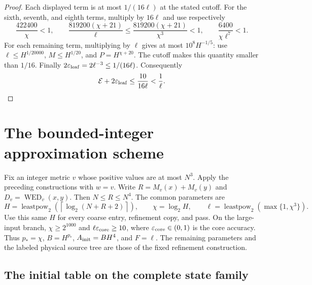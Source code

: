 \documentclass[11pt]{article}
\theoremstyle{definition}
\newcommand{\WED}{\operatorname{WED}}
\newcommand{\1}{\mathbf 1}
\begin{document}
\begin{proof}
Each displayed term is at most $1/(16\ell)$ at the stated cutoff. For the sixth, seventh, and eighth terms, multiply by $16\ell$ and use respectively
\[
 \frac{422400}{\chi}<1,\qquad
 \frac{819200(\chi+21)}{\ell}\le
 \frac{819200(\chi+21)}{\chi^3}<1,\qquad
 \frac{6400}{\chi\ell^7}<1.
\]
For each remaining term, multiplying by $\ell$ gives at most $10^8H^{-1/5}$: use $\ell\le H^{1/20000}$, $M\le H^{1/20}$, and $P=H^{\chi+20}$. The cutoff makes this quantity smaller than $1/16$. Finally $2\varepsilon_{\rm leaf}=2\ell^{-3}\le1/(16\ell)$. Consequently
\[
 \mathcal E+2\varepsilon_{\rm leaf}\le\frac{10}{16\ell}<\frac1\ell.
\]

\end{proof}



\section{The bounded-integer approximation scheme}
\label{paper:sec:evaluation}\label{paper:sec:assembly}

Fix an integer metric $v$ whose positive values are at most $N^3$.
Apply the preceding constructions with $w=v$.
Write $R=M_v(x)+M_v(y)$ and $D_v=\WED_v(x,y)$.
Then $N\le R\le N^4$. The common parameters are
\[
 H=\operatorname{leastpow}_2\!\left(
       \left\lceil\log_2(N+R+2)\right\rceil\right),\qquad
 \chi=\log_2H,\qquad
 \ell=\operatorname{leastpow}_2(\max\{1,\chi^3\}).
\]
Use this same $H$ for every coarse entry, refinement copy, and pass.
On the large-input branch, $\chi\ge2^{1000}$ and
$\ell\varepsilon_{\rm core}\ge10$, where
$\varepsilon_{\rm core}\in(0,1)$ is the core accuracy.
Thus $p_*=\chi$, $B=H^{p_*}$, $A_{\rm init}=BH^4$, and $F=\ell$.
The remaining parameters and the labeled physical source tree are those
of the fixed refinement construction.

\subsection{The initial table on the complete state family}
\end{document}
